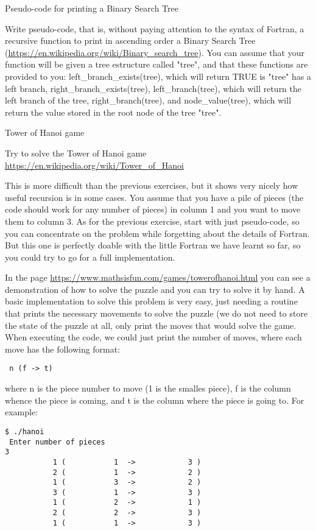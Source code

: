  {Pseudo-code for printing a Binary Search Tree}
\label{ex:rec-bst}

Write pseudo-code, that is, without paying attention to the syntax of
 Fortran, a recursive function to print in ascending order a Binary Search Tree
 (\url{https://en.wikipedia.org/wiki/Binary_search_tree}). You can assume that your
 function will be given a tree estructure called "tree", and that these
 functions are provided to you: left\_branch\_exists(tree), which will return TRUE
 is "tree" has a left branch, right\_branch\_exists(tree), left\_branch(tree),
 which will return the left branch of the tree, right\_branch(tree), and
 node\_value(tree), which will return the value stored in the root node of the
 tree "tree".

 {Tower of Hanoi game}
\label{ex:rec-hanoi}

Try to solve the Tower of Hanoi game \url{https://en.wikipedia.org/wiki/Tower_of_Hanoi}

 This is more difficult than the previous exercises, but it shows very nicely how
 useful recursion is in some cases. You assume that you have a pile of pieces
 (the code should work for any number of pieces) in column 1 and you want to
 move them to column 3. As for the previous exercise, start with just
 pseudo-code, so you can concentrate on the problem while forgetting about the
 details of Fortran. But this one is perfectly doable with the little Fortran we
 have learnt so far, so you could try to go for a full implementation.

 In the page \url{https://www.mathsisfun.com/games/towerofhanoi.html} you can see a
 demonstration of how to solve the puzzle and you can try to solve it by hand. A
 basic implementation to solve this problem is very easy, just needing a routine
 that prints the necessary movements to solve the puzzle (we do not need to
 store the state of the puzzle at all, only print the moves that would solve the
 game. When executing the code, we could just print the number of moves, where
 each move has the following format:

\begin{verbatim} 
 n (f -> t)
\end{verbatim} 

 where n is the piece number to move (1 is the smalles piece), f is the column
 whence the piece is coming, and t is the column where the piece is going
 to. For example:

\begin{verbatim} 
$ ./hanoi
 Enter number of pieces
3
           1 (           1  ->            3 )
           2 (           1  ->            2 )
           1 (           3  ->            2 )
           3 (           1  ->            3 )
           1 (           2  ->            1 )
           2 (           2  ->            3 )
           1 (           1  ->            3 )
\end{verbatim} 

